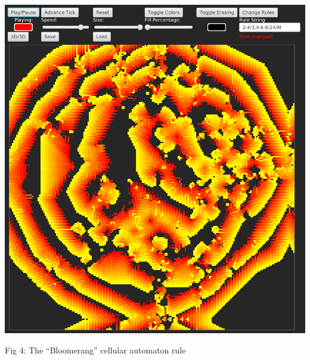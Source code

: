 \documentclass[11pt]{article}
\begin{document}
\begin{center}
\includegraphics[width=.9\linewidth]{./Fig4.png}
\end{center}
Fig 4:  The ``Bloomerang'' cellular automaton rule
\end{document}
